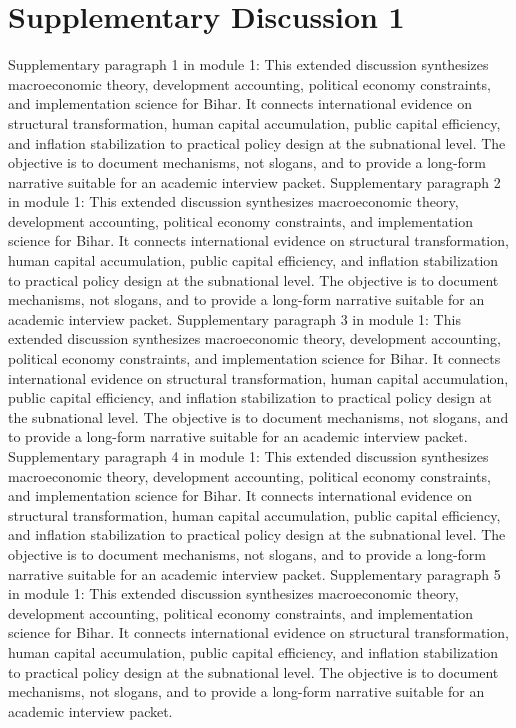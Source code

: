 \documentclass[preprint,12pt]{elsarticle}
\begin{document}
\section{Supplementary Discussion 1}
Supplementary paragraph 1 in module 1: This extended discussion synthesizes macroeconomic theory, development accounting, political economy constraints, and implementation science for Bihar. It connects international evidence on structural transformation, human capital accumulation, public capital efficiency, and inflation stabilization to practical policy design at the subnational level. The objective is to document mechanisms, not slogans, and to provide a long-form narrative suitable for an academic interview packet.
Supplementary paragraph 2 in module 1: This extended discussion synthesizes macroeconomic theory, development accounting, political economy constraints, and implementation science for Bihar. It connects international evidence on structural transformation, human capital accumulation, public capital efficiency, and inflation stabilization to practical policy design at the subnational level. The objective is to document mechanisms, not slogans, and to provide a long-form narrative suitable for an academic interview packet.
Supplementary paragraph 3 in module 1: This extended discussion synthesizes macroeconomic theory, development accounting, political economy constraints, and implementation science for Bihar. It connects international evidence on structural transformation, human capital accumulation, public capital efficiency, and inflation stabilization to practical policy design at the subnational level. The objective is to document mechanisms, not slogans, and to provide a long-form narrative suitable for an academic interview packet.
Supplementary paragraph 4 in module 1: This extended discussion synthesizes macroeconomic theory, development accounting, political economy constraints, and implementation science for Bihar. It connects international evidence on structural transformation, human capital accumulation, public capital efficiency, and inflation stabilization to practical policy design at the subnational level. The objective is to document mechanisms, not slogans, and to provide a long-form narrative suitable for an academic interview packet.
Supplementary paragraph 5 in module 1: This extended discussion synthesizes macroeconomic theory, development accounting, political economy constraints, and implementation science for Bihar. It connects international evidence on structural transformation, human capital accumulation, public capital efficiency, and inflation stabilization to practical policy design at the subnational level. The objective is to document mechanisms, not slogans, and to provide a long-form narrative suitable for an academic interview packet.
\end{document}
